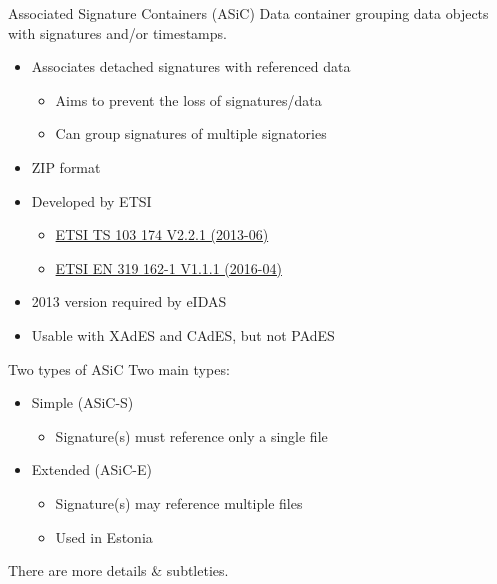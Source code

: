 \begin{frame}{Associated Signature Containers (ASiC)}
  Data container grouping data objects with signatures and/or timestamps.
  \begin{itemize}[<+(1)->]
    \item Associates detached signatures with referenced data
    \begin{itemize}
      \item Aims to prevent the loss of signatures/data
      \item Can group signatures of multiple signatories
    \end{itemize}
    \item ZIP format
    \item Developed by ETSI
    \begin{itemize}
      \item \href{http://www.etsi.org/deliver/etsi_ts/103100_103199/103174/02.02.01_60/ts_103174v020201p.pdf}{ETSI TS 103 174 V2.2.1 (2013-06)}
      \item \href{http://www.etsi.org/deliver/etsi_en/319100_319199/31916202/01.01.01_60/en_31916202v010101p.pdf}{ETSI EN 319 162-1 V1.1.1 (2016-04)}
    \end{itemize}
    \item 2013 version required by eIDAS
    \item Usable with XAdES and CAdES, but not PAdES
  \end{itemize}
\end{frame}

\begin{frame}{Two types of ASiC}
  Two main types:
  \begin{itemize}[<+(1)->]
    \item Simple (ASiC-S)
    \begin{itemize}
      \item Signature(s) must reference only a single file
    \end{itemize}
    \item Extended (ASiC-E)
    \begin{itemize}
      \item Signature(s) may reference multiple files
      \item Used in Estonia
    \end{itemize}
  \end{itemize}

  \vspace*{1em}

  \pause
  There are more details \& subtleties.
\end{frame}

